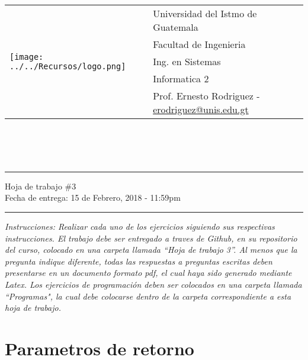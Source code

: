 \documentclass{article}
\newcommand{\horrule}[1]{\rule{\linewidth}{#1}}
\newcommand{\perlscript}[2]{
\begin{itemize}
\item[]
\end{itemize}
}
\begin{document}
\begin{tabular}{l l}
\multirow{5}{*}{\texttt{[image: ../../Recursos/logo.png]}} & Universidad del Istmo de Guatemala \\
 & Facultad de Ingenieria \\
 & Ing. en Sistemas \\
 & Informatica 2 \\
 & Prof. Ernesto Rodriguez - \href{mailto:erodriguez@unis.edu.gt}{erodriguez@unis.edu.gt} \\
\end{tabular}
\\\\\\

\begin{center}
        \horrule{0.5pt}
        \huge{Hoja de trabajo \#3} \\
        \large{Fecha de entrega: 15 de Febrero, 2018 - 11:59pm} \\
        \horrule{1pt}
\end{center}
\emph{Instrucciones: Realizar cada uno de los ejercicios siguiendo sus respectivas
instrucciones. El trabajo debe ser entregado a traves de Github, en su repositorio del curso, colocado en una carpeta llamada ``Hoja de trabajo 3''.
Al menos que la pregunta indique diferente, todas las respuestas a preguntas escritas deben presentarse en
un documento formato pdf, el cual haya sido generado mediante Latex. Los ejercicios de programaci\'on deben ser colocados en una carpeta
llamada ``Programas", la cual debe colocarse dentro de la carpeta correspondiente a esta hoja de trabajo.}


\section*{Parametros de retorno}
\end{document}
